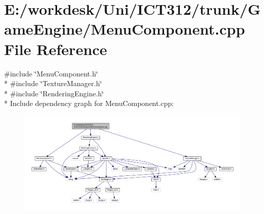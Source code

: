 \section{E\+:/workdesk/\+Uni/\+I\+C\+T312/trunk/\+Game\+Engine/\+Menu\+Component.cpp File Reference}
\label{_menu_component_8cpp}
{\ttfamily \#include \char`\"{}Menu\+Component.\+h\char`\"{}}\\*
{\ttfamily \#include \char`\"{}Texture\+Manager.\+h\char`\"{}}\\*
{\ttfamily \#include \char`\"{}Rendering\+Engine.\+h\char`\"{}}\\*
Include dependency graph for Menu\+Component.\+cpp\+:\nopagebreak
\begin{figure}[H]
\begin{center}
\leavevmode
\includegraphics[width=350pt]{d9/da8/_menu_component_8cpp__incl}
\end{center}
\end{figure}
